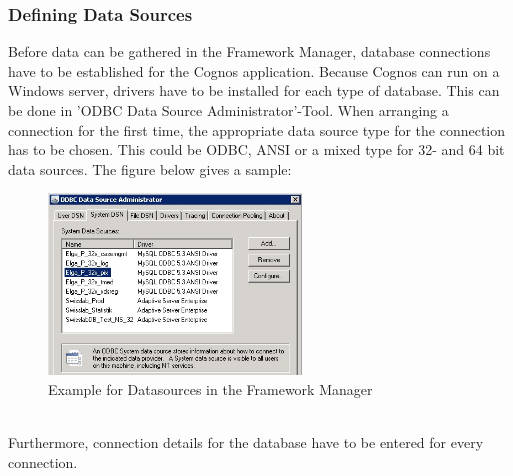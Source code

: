 \documentclass[a4paper]{article}
\begin{document}
	\subsubsection{Defining Data Sources}
	Before data can be gathered in the Framework Manager, database connections have
	to be established for the Cognos application. Because Cognos can run on a
	Windows server, drivers have to be installed for each type of database. This
	can be done in 'ODBC Data Source Administrator'-Tool. When arranging a
	connection for the first time, the appropriate data source type for the
	connection has to be chosen. This could be ODBC, ANSI or a mixed type for 32-
	and 64 bit data sources. The figure below gives a sample:\\
	\begin{figure}[!ht]
		  \centering
		      \includegraphics[width=0.6\textwidth]{ExistingDataSource}
		  \caption{Example for Datasources in the Framework Manager}
	\end{figure}\\
	Furthermore, connection details for the database have to be entered for every
	connection.
\end{document}
